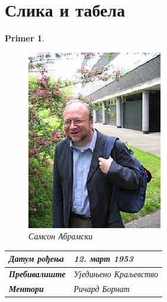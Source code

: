 \documentclass[a4paper]{article}
\newtheorem{primer}{Primer}[section]
\begin{document}
\section{Слика и табела}
\label{slike_i_tabele}

\begin{primer} 
\begin{figure}[h!]
\begin{center}
\includegraphics[scale=0.75]{abramski.eps}
\end{center}
\caption{Самсон Абрамски}
\label{fig:samson}
\end{figure}

\begin{table}[h!]
\begin{center}
\begin{tabular}{|l|l|} \hline
\textbf{Датум рођења} &12. март 1953\\ \hline
\textbf{Пребивалиште} &	Уједињено Краљевство\\ \hline
\textbf {Ментори} & Ричард Борнат\\ \hline
\end{tabular}
\label{tab:tabela1}
\end{center}
\end{table}

\end{primer}
\end{document}

